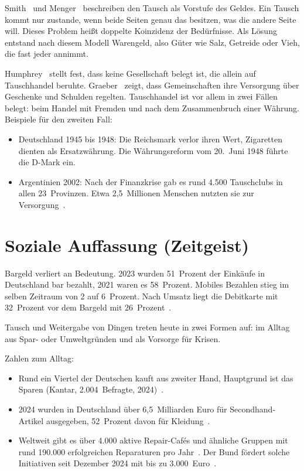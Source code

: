 \documentclass[11pt, a4paper]{article}
\begin{document}
Smith~\cite{smith1776} und Menger~\cite{menger1892} beschreiben den Tausch als
Vorstufe des Geldes. Ein Tausch kommt nur zustande, wenn beide Seiten genau
das besitzen, was die andere Seite will. Dieses Problem heißt doppelte
Koinzidenz der Bedürfnisse. Als Lösung entstand nach diesem Modell Warengeld,
also Güter wie Salz, Getreide oder Vieh, die fast jeder annimmt.

Humphrey~\cite{humphrey1985} stellt fest, dass keine Gesellschaft belegt ist,
die allein auf Tauschhandel beruhte. Graeber~\cite{graeber2011} zeigt, dass
Gemeinschaften ihre Versorgung über Geschenke und Schulden regelten.
Tauschhandel ist vor allem in zwei Fällen belegt: beim Handel mit Fremden und
nach dem Zusammenbruch einer Währung. Beispiele für den zweiten Fall:

\begin{itemize}
    \item Deutschland 1945 bis 1948: Die Reichsmark verlor ihren Wert,
          Zigaretten dienten als Ersatzwährung. Die Währungsreform vom
          20.~Juni 1948 führte die D-Mark ein.
    \item Argentinien 2002: Nach der Finanzkrise gab es rund 4.500
          Tauschclubs in allen 23~Provinzen. Etwa 2,5~Millionen Menschen
          nutzten sie zur Versorgung~\cite{ambito2002}.
\end{itemize}

\section{Soziale Auffassung (Zeitgeist)}

Bargeld verliert an Bedeutung. 2023 wurden 51~Prozent der Einkäufe in
Deutschland bar bezahlt, 2021 waren es 58~Prozent. Mobiles Bezahlen stieg im
selben Zeitraum von 2 auf 6~Prozent. Nach Umsatz liegt die Debitkarte mit
32~Prozent vor dem Bargeld mit 26~Prozent~\cite{bundesbank2024}.

Tausch und Weitergabe von Dingen treten heute in zwei Formen auf: im Alltag
aus Spar- oder Umweltgründen und als Vorsorge für Krisen.

Zahlen zum Alltag:
\begin{itemize}
    \item Rund ein Viertel der Deutschen kauft aus zweiter Hand, Hauptgrund
          ist das Sparen (Kantar, 2.004~Befragte, 2024)~\cite{idealo2024}.
    \item 2024 wurden in Deutschland über 6,5~Milliarden Euro für
          Secondhand-Artikel ausgegeben, 52~Prozent davon für
          Kleidung~\cite{cebr2025}.
    \item Weltweit gibt es über 4.000 aktive Repair-Cafés und ähnliche
          Gruppen mit rund 190.000 erfolgreichen Reparaturen pro
          Jahr~\cite{nltimes2024}. Der Bund fördert solche Initiativen seit
          Dezember 2024 mit bis zu 3.000~Euro~\cite{heise2024}.
\end{itemize}
\end{document}
